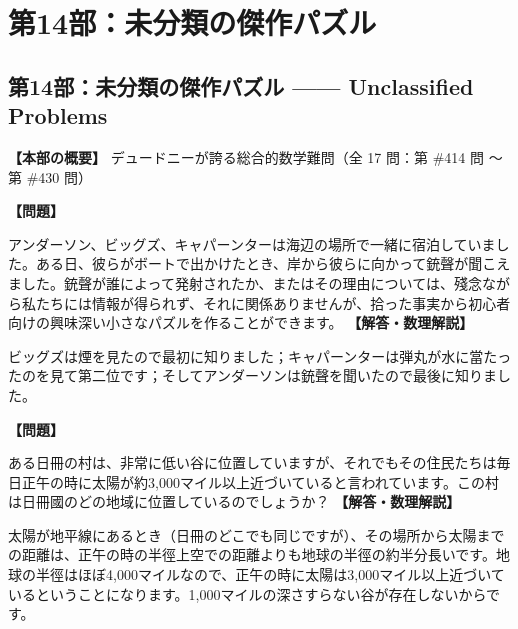 \documentclass[10pt,a4paper,oneside,openany]{ltjsbook}
\begin{document}
\part{第14部：未分類の傑作パズル}
\chapter*{第14部：未分類の傑作パズル —— Unclassified Problems}

\textbf{【本部の概要】} デュードニーが誇る総合的数学難問（全 17 問：第 \#414 問 〜 第 \#430 問）

\vspace{1em}

\begin{tcolorbox}[colback=softblue,colframe=primaryblue,title=\textbf{第 414 問：誰が最初に知ったか？ （原題: WHO WAS FIRST?）},arc=2mm,boxrule=1pt,breakable]
\textbf{【問題】}\par\vspace{0.3em}
アンダーソン、ビッグズ、キャパーンターは海辺の場所で一緒に宿泊していました。ある日、彼らがボートで出かけたとき、岸から彼らに向かって銃聲が聞こえました。銃聲が誰によって発射されたか、またはその理由については、殘念ながら私たちには情報が得られず、それに関係ありませんが、拾った事実から初心者向けの興味深い小さなパズルを作ることができます。
\tcblower
\textbf{【解答・数理解説】}\par\vspace{0.3em}
ビッグズは煙を見たので最初に知りました；キャパーンターは弾丸が水に當たったのを見て第二位です；そしてアンダーソンは銃聲を聞いたので最後に知りました。
\end{tcolorbox}

\begin{tcolorbox}[colback=softblue,colframe=primaryblue,title=\textbf{第 415 問：素晴らしい村 （原題: A WONDERFUL VILLAGE.）},arc=2mm,boxrule=1pt,breakable]
\textbf{【問題】}\par\vspace{0.3em}
ある日冊の村は、非常に低い谷に位置していますが、それでもその住民たちは毎日正午の時に太陽が約3,000マイル以上近づいていると言われています。この村は日冊國のどの地域に位置しているのでしょうか？
\tcblower
\textbf{【解答・数理解説】}\par\vspace{0.3em}
太陽が地平線にあるとき（日冊のどこでも同じですが）、その場所から太陽までの距離は、正午の時の半徑上空での距離よりも地球の半徑の約半分長いです。地球の半徑はほぼ4,000マイルなので、正午の時に太陽は3,000マイル以上近づいているということになります。1,000マイルの深さすらない谷が存在しないからです。
\end{tcolorbox}
\end{document}
